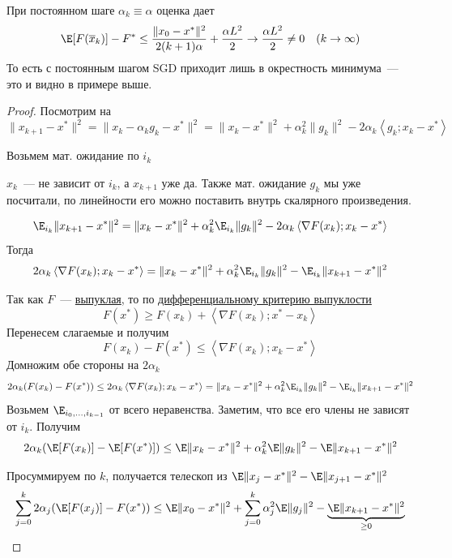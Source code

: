 \begin{remark}
  При постоянном шаге $\alpha_k \equiv \alpha$ оценка дает
  \[
  \E [F(\overline{x}_k)] - F^{*} \le \frac{\|x_0 - x^{*}\|^2}{2(k+1)\alpha} + \frac{\alpha L^2}{2} \rightarrow \frac{\alpha L^2}{2} \ne 0 \quad (k \rightarrow \infty)
  \]
  То есть с постоянным шагом SGD приходит лишь в окрестность минимума~--- это и видно в примере выше.
\end{remark}

\begin{proof}
  Посмотрим на
  \[
  \|x_{k+1} - x^{*}\|^2 = \|x_k - \alpha_k g_k - x^{*}\|^2
  = \|x_k - x^{*}\|^2 + \alpha_k^2 \|g_k\|^2 - 2\alpha_k \left\langle g_k; x_k-x^{*} \right\rangle
  \]

  Возьмем мат. ожидание по $i_k$

  \begin{remark}
    $x_k$~--- не зависит от $i_k$, а $x_{k+1}$ уже да. Также мат. ожидание $g_k$ мы уже посчитали, по линейности его можно поставить внутрь скалярного произведения.
  \end{remark}

  \[
  \E_{i_k} \|x_{k+1} - x^{*}\|^2 = \|x_k -x^{*}\|^2 + \alpha^2_k \E_{i_k}\|g_k\|^2 - 2\alpha_k \left\langle \nabla F(x_k); x_k - x^{*} \right\rangle
  \]
  Тогда
  \[
  2\alpha_k \left\langle \nabla F(x_k); x_k - x^{*} \right\rangle =
   \|x_k -x^{*}\|^2 + \alpha^2_k \E_{i_k}\|g_k\|^2 - \E_{i_k} \|x_{k+1} - x^{*}\|^2
  \]

  Так как $F$~--- \hyperref[note:1CA14F2C-637F-41DE-9E97-72075D19E97F]{выпуклая}, то по \hyperref[note:18BD8497-CEBD-4962-8144-474B489606C3]{дифференциальному критерию выпуклости}
  \[
  F(x^{*}) \ge F(x_k) + \left\langle \nabla F(x_k); x^{*} - x_k \right\rangle
  \]
  Перенесем слагаемые и получим
  \[
  F(x_k) - F(x^{*}) \le \left\langle \nabla F(x_k); x_k - x^{*} \right\rangle
  \]
  Домножим обе стороны на $2\alpha_k$
  \[
  2\alpha_k(F(x_k) - F(x^{*})) \le 2\alpha_k\left\langle \nabla F(x_k); x_k - x^{*} \right\rangle =
   \|x_k -x^{*}\|^2 + \alpha^2_k \E_{i_k}\|g_k\|^2 - \E_{i_k} \|x_{k+1} - x^{*}\|^2
  \]
  Возьмем $\E_{i_0,...,i_{k-1}}$ от всего неравенства. Заметим, что все его члены не зависят от $i_{k}$. Получим
  \[
  2\alpha_k( \E[F(x_k)] - \E[F(x^{*})]) \le
   \E \|x_k -x^{*}\|^2 + \alpha^2_k \E\|g_k\|^2 - \E \|x_{k+1} - x^{*}\|^2
  \]

  Просуммируем по $k$, получается телескоп из $\E \|x_j -x^{*}\|^2 - \E \|x_{j+1} -x^{*}\|^2$
  \[
  \sum\limits_{j=0}^k
  2\alpha_j( \E[F(x_j)] - F(x^{*})) \le
   \E \|x_0 -x^{*}\|^2 + \sum\limits_{j=0}^{k} \alpha^2_j \E\|g_j\|^2 - \underbrace{\E \|x_{k+1} - x^{*}\|^2}_{\ge0}
  \]


\end{proof}
